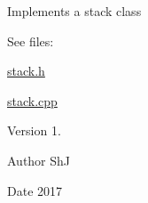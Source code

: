 Implements a stack class

See files\+:
\begin{DoxyItemize}
\item \hyperlink{stack_8h}{stack.\+h}
\item \hyperlink{stack_8cpp}{stack.\+cpp}
\end{DoxyItemize}

\begin{DoxyVersion}{Version}
1.
\end{DoxyVersion}
\begin{DoxyAuthor}{Author}
ShJ 
\end{DoxyAuthor}
\begin{DoxyDate}{Date}
2017 
\end{DoxyDate}
